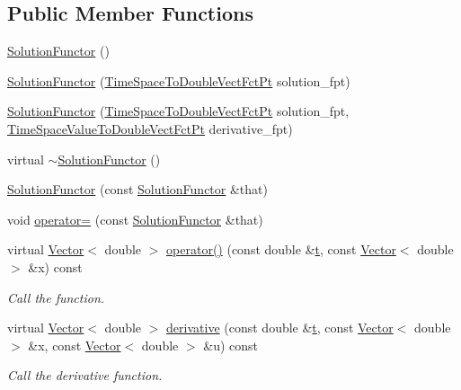 \subsection*{Public Member Functions}
\begin{DoxyCompactItemize}
\item 
\hyperlink{classoomph_1_1SolutionFunctor_a38ef9471c4f57552b50236c4598349b0}{Solution\+Functor} ()
\item 
\hyperlink{classoomph_1_1SolutionFunctor_affba272bc861b18cab3a1975496427c1}{Solution\+Functor} (\hyperlink{classoomph_1_1SolutionFunctorBase_a6df07384ce36c784c7befe7d7bf4a606}{Time\+Space\+To\+Double\+Vect\+Fct\+Pt} solution\+\_\+fpt)
\item 
\hyperlink{classoomph_1_1SolutionFunctor_a95e64ff5b9c4137a58002c6298ab452d}{Solution\+Functor} (\hyperlink{classoomph_1_1SolutionFunctorBase_a6df07384ce36c784c7befe7d7bf4a606}{Time\+Space\+To\+Double\+Vect\+Fct\+Pt} solution\+\_\+fpt, \hyperlink{classoomph_1_1SolutionFunctorBase_aca237d543e590a388b771aea22d3aad6}{Time\+Space\+Value\+To\+Double\+Vect\+Fct\+Pt} derivative\+\_\+fpt)
\item 
virtual \hyperlink{classoomph_1_1SolutionFunctor_a1fba5654355a0974ec399ae09a9fb43c}{$\sim$\+Solution\+Functor} ()
\item 
\hyperlink{classoomph_1_1SolutionFunctor_ad3573f5322c41bc9bc56667393947774}{Solution\+Functor} (const \hyperlink{classoomph_1_1SolutionFunctor}{Solution\+Functor} \&that)
\item 
void \hyperlink{classoomph_1_1SolutionFunctor_a7ac79a73917fc149efad11d6a26e29f5}{operator=} (const \hyperlink{classoomph_1_1SolutionFunctor}{Solution\+Functor} \&that)
\item 
virtual \hyperlink{classoomph_1_1Vector}{Vector}$<$ double $>$ \hyperlink{classoomph_1_1SolutionFunctor_ae0428bc44f99335bd2b3d6f7203984d5}{operator()} (const double \&\hyperlink{cfortran_8h_af6f0bd3dc13317f895c91323c25c2b8f}{t}, const \hyperlink{classoomph_1_1Vector}{Vector}$<$ double $>$ \&x) const
\begin{DoxyCompactList}\small\item\em Call the function. \end{DoxyCompactList}\item 
virtual \hyperlink{classoomph_1_1Vector}{Vector}$<$ double $>$ \hyperlink{classoomph_1_1SolutionFunctor_a3e597c5cb36305a3a01471fadd03aee2}{derivative} (const double \&\hyperlink{cfortran_8h_af6f0bd3dc13317f895c91323c25c2b8f}{t}, const \hyperlink{classoomph_1_1Vector}{Vector}$<$ double $>$ \&x, const \hyperlink{classoomph_1_1Vector}{Vector}$<$ double $>$ \&u) const
\begin{DoxyCompactList}\small\item\em Call the derivative function. \end{DoxyCompactList}\end{DoxyCompactItemize}
